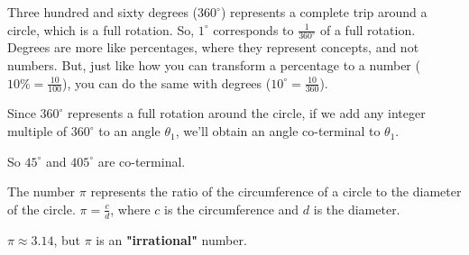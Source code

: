 Three hundred and sixty degrees ($360^{\circ}$) represents a complete trip
around a circle, which is a full rotation. So, $1^{\circ}$ corresponds to 
$\frac{1}{360^{\circ}}$ of a full rotation. Degrees are more like percentages,
where they represent concepts, and not numbers. But, just like how you can
transform a percentage to a number ($10 \% = \frac{10}{100}$), you can do the
same with degrees ($10^{\circ} = \frac{10}{360}$).

Since $360^{\circ}$ represents a full rotation around the circle, if we add any
integer multiple of $360^{\circ}$ to an angle $\theta_1$, we'll obtain an angle
co-terminal to $\theta_1$.

\begin{example}
  \label{exm:co_terminal_to_theta}

  So $45^{\circ}$ and $405^{\circ}$ are co-terminal.
\end{example}

\begin{definition}[$\pi$]
  \label{def:pi}

  The number $\pi$ represents the ratio of the circumference of a circle to the
  diameter of the circle. $\pi = \frac{c}{d}$, where $c$ is the circumference
  and $d$ is the diameter.
  
  $\pi \approx 3.14$, but $\pi$ is an \textbf{"irrational"} number.
\end{definition}

